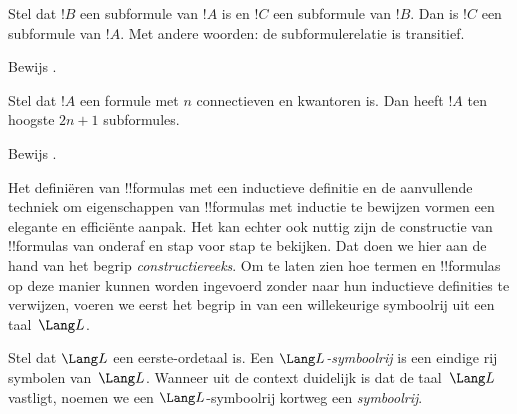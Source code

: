 \documentclass[openany]{memoir}
\begin{document}
\begin{prop}
Stel dat $!B$ een subformule van $!A$ is en $!C$ een subformule van
$!B$. Dan is $!C$ een subformule van $!A$. Met andere woorden: de
subformulerelatie is transitief.
\end{prop}

\begin{prob}
Bewijs .
\end{prob}

\begin{prop}
Stel dat $!A$ een formule met $n$ connectieven en kwantoren is. Dan
heeft $!A$ ten hoogste $2n+1$ subformules.
\end{prop}

\begin{prob}
Bewijs .
\end{prob}
\endgroup

\begingroup
\def\olfilename{OLP-0156}
\def\olfilepath{content/first-order-logic/syntax-and-semantics/}
\hypertarget{unit-OLP-0156}{}





Het definiëren van !!{formula}s met een inductieve definitie en de
aanvullende techniek om eigenschappen van !!{formula}s met inductie te
bewijzen vormen een elegante en efficiënte aanpak. Het kan echter ook
nuttig zijn de constructie van !!{formula}s van onderaf en stap voor
stap te bekijken. Dat doen we hier aan de hand van het begrip
\emph{constructiereeks}.
%
Om te laten zien hoe termen en !!{formula}s op deze manier kunnen worden
ingevoerd zonder naar hun inductieve definities te verwijzen, voeren we
eerst het begrip in van een willekeurige symboolrij uit een taal~$\Lang L$.

\begin{defn}[Symboolrijen]
Stel dat $\Lang L$ een eerste-ordetaal is. Een \emph{$\Lang
L$-symboolrij} is een eindige rij symbolen van~$\Lang L$. Wanneer uit de
context duidelijk is dat de taal~$\Lang L$ vastligt, noemen we een
$\Lang L$-symboolrij kortweg een \emph{symboolrij}.
\end{defn}
\end{document}
